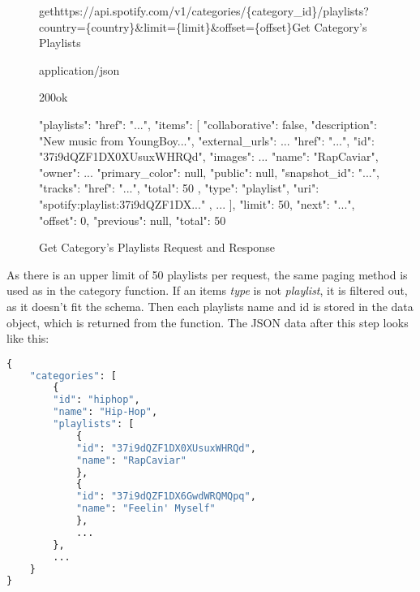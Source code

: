 \begin{figure}[H]
    \caption{Get Category's Playlists Request and Response}
	\label{fig:Get Category's Playlists Request and Response}
\begin{apiRoute}{get}{https://api.spotify.com/v1/categories/\{category\_id\}/playlists?country=\{country\}\&limit=\{limit\}\&offset=\{offset\}}{Get Category's Playlists}
    \begin{routeParameter}
    \end{routeParameter}
    \begin{routeResponse}{application/json}
        \begin{routeResponseItem}{200}{ok}
            \begin{routeResponseItemBody}
{
  "playlists": {
    "href": "...",
    "items": [
      {
        "collaborative": false,
        "description": "New music from YoungBoy...",
        "external_urls": ...
        "href": "...",
        "id": "37i9dQZF1DX0XUsuxWHRQd",
        "images": ...
        "name": "RapCaviar",
        "owner": ...
        "primary_color": null,
        "public": null,
        "snapshot_id": "...",
        "tracks": {
          "href": "...",
          "total": 50
        },
        "type": "playlist",
        "uri": "spotify:playlist:37i9dQZF1DX..."
      },
      ...
    ],
    "limit": 50,
    "next": "...",
    "offset": 0,
    "previous": null,
    "total": 50
  }
}
            \end{routeResponseItemBody}
        \end{routeResponseItem}
    \end{routeResponse}
\end{apiRoute}
\end{figure}

As there is an upper limit of 50 playlists per request, the same paging method is used as in the category function.
If an items \emph{type} is not \emph{playlist}, it is filtered out, as it doesn't fit the schema.
Then each playlists name and id is stored in the data object, which is returned from the function.
The JSON data after this step looks like this:

\begin{lstlisting}[language=Python]
{
    "categories": [
        {
        "id": "hiphop",
        "name": "Hip-Hop",
        "playlists": [
            {
            "id": "37i9dQZF1DX0XUsuxWHRQd",
            "name": "RapCaviar"
            },
            {
            "id": "37i9dQZF1DX6GwdWRQMQpq",
            "name": "Feelin' Myself"
            },
            ...
        },
        ...
    }
}
\end{lstlisting}

